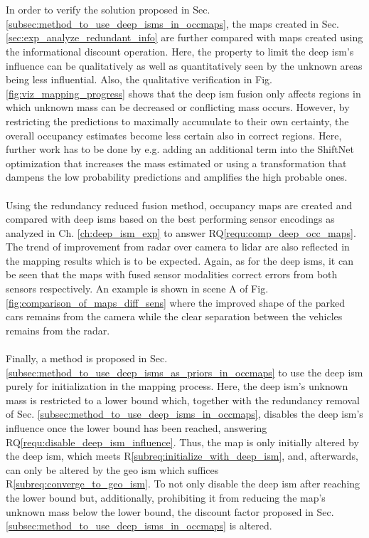\\\\
In order to verify the solution proposed in Sec. \ref{subsec:method_to_use_deep_isms_in_occmaps}, the maps created in Sec. \ref{sec:exp_analyze_redundant_info} are further compared with maps created using the informational discount operation. Here, the property to limit the deep \gls{ism}'s influence can be qualitatively as well as quantitatively seen by the unknown areas being less influential. Also, the qualitative verification in Fig. \ref{fig:viz_mapping_progress} shows that the deep \gls{ism} fusion only affects regions in which unknown mass can be decreased or conflicting mass occurs. However, by restricting the predictions to maximally accumulate to their own certainty, the overall occupancy estimates become less certain also in correct regions. Here, further work has to be done by e.g. adding an additional term into the ShiftNet optimization that increases the mass estimated or using a transformation that dampens the low probability predictions and amplifies the high probable ones.
\\\\
Using the redundancy reduced fusion method, occupancy maps are created and compared with deep \gls{ism}s based on the best performing sensor encodings as analyzed in Ch. \ref{ch:deep_ism_exp} to answer RQ\ref{requ:comp_deep_occ_maps}. The trend of improvement from radar over camera to lidar are also reflected in the mapping results which is to be expected. Again, as for the deep \gls{ism}s, it can be seen that the maps with fused sensor modalities correct errors from both sensors respectively. An example is shown in scene A of Fig. \ref{fig:comparison_of_maps_diff_sens} where the improved shape of the parked cars remains from the camera while the clear separation between the vehicles remains from the radar.
\\\\
Finally, a method is proposed in Sec. \ref{subsec:method_to_use_deep_isms_as_priors_in_occmaps} to use the deep \gls{ism} purely for initialization in the mapping process. Here, the deep \gls{ism}'s unknown mass is restricted to a lower bound which, together with the redundancy removal of Sec. \ref{subsec:method_to_use_deep_isms_in_occmaps}, disables the deep \gls{ism}'s influence once the lower bound has been reached, answering RQ\ref{requ:disable_deep_ism_influence}. Thus, the map is only initially altered by the deep \gls{ism}, which meets R\ref{subreq:initialize_with_deep_ism}, and, afterwards, can only be altered by the geo \gls{ism} which suffices R\ref{subreq:converge_to_geo_ism}. To not only disable the deep \gls{ism} after reaching the lower bound but, additionally, prohibiting it from reducing the map's unknown mass below the lower bound, the discount factor proposed in Sec. \ref{subsec:method_to_use_deep_isms_in_occmaps} is altered.
